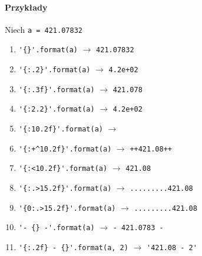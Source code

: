 \documentclass[a4paper]{article}
\begin{document}
\paragraph{Przykłady} Niech \verb|a = 421.07832|
\begin{enumerate}[label=\alph*)]
    \item \verb|'{}'.format(a)| $\rightarrow$ \verb|421.07832|
    \item \verb|'{:.2}'.format(a)| $\rightarrow$ \verb|4.2e+02|
    \item \verb|'{:.3f}'.format(a)| $\rightarrow$ \verb|421.078|
    \item \verb|'{:2.2}'.format(a)| $\rightarrow$ \verb|4.2e+02|
    \item \verb|'{:10.2f}'.format(a)| $\rightarrow$ \texttt{\textvisiblespace\textvisiblespace\textvisiblespace{}}
    \item \verb|'{:+^10.2f}'.format(a)| $\rightarrow$ \verb|++421.08++|
    \item \verb|'{:<10.2f}'.format(a)| $\rightarrow$ \texttt{421.08\textvisiblespace\textvisiblespace\textvisiblespace\textvisiblespace}
    \item \verb|'{:.>15.2f}'.format(a)| $\rightarrow$ \verb|.........421.08|
    \item \verb|'{0:.>15.2f}'.format(a)| $\rightarrow$ \verb|.........421.08|
    \item \verb|'- {} -'.format(a)| $\rightarrow$ \verb|- 421.0783 -|
    \item \verb|'{:.2f} - {}'.format(a, 2)| $\rightarrow$ \verb|'421.08 - 2'|
\end{enumerate}
\end{document}
